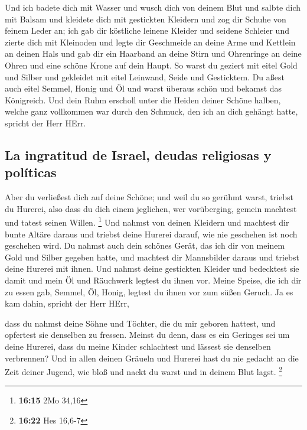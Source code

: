  Und ich badete dich mit Wasser und wusch dich von deinem
Blut und salbte dich mit Balsam  und kleidete dich mit
gestickten Kleidern und zog dir Schuhe von feinem Leder an; ich gab dir
köstliche leinene Kleider und seidene Schleier  und
zierte dich mit Kleinoden und legte dir Geschmeide an deine Arme und
Kettlein an deinen Hals  und gab dir ein Haarband an
deine Stirn und Ohrenringe an deine Ohren und eine schöne Krone auf dein
Haupt.  So warst du geziert mit eitel Gold und Silber und
gekleidet mit eitel Leinwand, Seide und Gesticktem. Du aßest auch eitel
Semmel, Honig und Öl und warst überaus schön und bekamst das Königreich.
 Und dein Ruhm erscholl unter die Heiden deiner Schöne
halben, welche ganz vollkommen war durch den Schmuck, den ich an dich
gehängt hatte, spricht der Herr HErr.

\hypertarget{la-ingratitud-de-israel-deudas-religiosas-y-poluxedticas}{%
\subsection{La ingratitud de Israel, deudas religiosas y
políticas}\label{la-ingratitud-de-israel-deudas-religiosas-y-poluxedticas}}

 Aber du verließest dich auf deine Schöne; und weil du so
gerühmt warst, triebst du Hurerei, also dass du dich einem jeglichen,
wer vorüberging, gemein machtest und tatest seinen Willen. \footnote{\textbf{16:15}
  2Mo 34,16}  Und nahmst von deinen Kleidern und machtest
dir bunte Altäre daraus und triebst deine Hurerei darauf, wie nie
geschehen ist noch geschehen wird.  Du nahmst auch dein
schönes Gerät, das ich dir von meinem Gold und Silber gegeben hatte, und
machtest dir Mannsbilder daraus und triebst deine Hurerei mit ihnen.
 Und nahmst deine gestickten Kleider und bedecktest sie
damit und mein Öl und Räuchwerk legtest du ihnen vor. 
Meine Speise, die ich dir zu essen gab, Semmel, Öl, Honig, legtest du
ihnen vor zum süßen Geruch. Ja es kam dahin, spricht der Herr HErr,

 dass du nahmst deine Söhne und Töchter, die du mir
geboren hattest, und opfertest sie denselben zu fressen. Meinst du denn,
dass es ein Geringes sei um deine Hurerei,  dass du meine
Kinder schlachtest und lässest sie denselben verbrennen? 
Und in allen deinen Gräueln und Hurerei hast du nie gedacht an die Zeit
deiner Jugend, wie bloß und nackt du warst und in deinem Blut lagst.
\footnote{\textbf{16:22} Hes 16,6-7}

